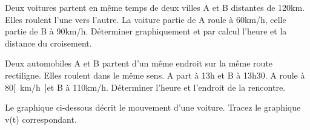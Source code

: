 \begin{exercise}
\end{exercise}

\begin{exercise}
    Deux voitures partent en même temps de deux villes A et B distantes de 120km. Elles roulent l'une vers l'autre. La voiture partie de A roule à 60km/h, celle partie de B à 90km/h. Déterminer graphiquement et par calcul l'heure et la distance du croisement.
\end{exercise}
\begin{solution}
\end{solution}

\begin{exercise}
    Deux automobiles A et B partent d'un même endroit sur la même route rectiligne. Elles roulent dans le même sens. A part à 13h et B à 13h30. A roule à 80\unit{[km/h]}et B à 110km/h. Déterminer l'heure et l'endroit de la rencontre.
\end{exercise}
\begin{solution}
\end{solution}

\begin{exercise}
    Le graphique ci-dessous décrit le mouvement d'une voiture. Tracez le graphique v(t) correspondant.

\end{exercise}

